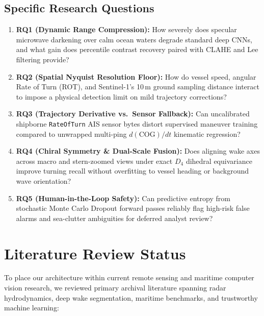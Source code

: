 \documentclass[11pt,a4paper]{article}
\begin{document}
\subsection{Specific Research Questions}
\begin{enumerate}[label=\roman*),leftmargin=2em]
    \item \textbf{RQ1 (Dynamic Range Compression):} How severely does specular microwave darkening over calm ocean waters degrade standard deep CNNs, and what gain does percentile contrast recovery paired with CLAHE and Lee filtering provide?
    \item \textbf{RQ2 (Spatial Nyquist Resolution Floor):} How do vessel speed, angular Rate of Turn (ROT), and Sentinel-1's 10\,m ground sampling distance interact to impose a physical detection limit on mild trajectory corrections?
    \item \textbf{RQ3 (Trajectory Derivative vs.\ Sensor Fallback):} Can uncalibrated shipborne \texttt{RateOfTurn} AIS sensor bytes distort supervised maneuver training compared to unwrapped multi-ping $d(\text{COG})/dt$ kinematic regression?
    \item \textbf{RQ4 (Chiral Symmetry \& Dual-Scale Fusion):} Does aligning wake axes across macro and stern-zoomed views under exact $D_4$ dihedral equivariance improve turning recall without overfitting to vessel heading or background wave orientation?
    \item \textbf{RQ5 (Human-in-the-Loop Safety):} Can predictive entropy from stochastic Monte Carlo Dropout forward passes reliably flag high-risk false alarms and sea-clutter ambiguities for deferred analyst review?
\end{enumerate}

\section{Literature Review Status}

To place our architecture within current remote sensing and maritime computer vision research, we reviewed primary archival literature spanning radar hydrodynamics, deep wake segmentation, maritime benchmarks, and trustworthy machine learning:
\end{document}
